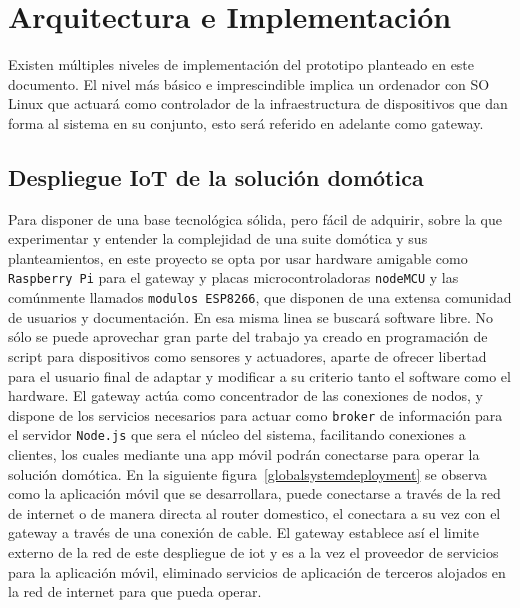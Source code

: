 \cleardoublepage

\chapter{Arquitectura e Implementación}
\label{ch:Capitulo4}

Existen múltiples niveles de implementación del prototipo planteado en este documento. El nivel más básico e imprescindible implica un ordenador con SO Linux que actuará como controlador de la infraestructura de dispositivos que dan forma al sistema en su conjunto, esto será referido en adelante como \gls{gateway}.


\section{Despliegue IoT de la solución domótica}
\label{ch:Capitulo4.1}
\vspace{1cm}

Para disponer de una base tecnológica sólida, pero fácil de adquirir, sobre la que experimentar y entender la complejidad de una suite domótica y sus planteamientos, en este proyecto se opta por usar hardware amigable como \verb|Raspberry Pi| para el \gls{gateway} y placas microcontroladoras \verb|nodeMCU| y las comúnmente llamados \verb|modulos ESP8266|, que disponen de una extensa comunidad de usuarios y documentación. En esa misma linea se buscará software libre. No sólo se puede aprovechar gran parte del trabajo ya creado en programación de \gls{script} para dispositivos como sensores y actuadores, aparte de ofrecer libertad para el usuario final de adaptar y modificar a su criterio tanto el software como el hardware. El \gls{gateway} actúa como concentrador de las conexiones de nodos, y dispone de los servicios necesarios para actuar como \verb|broker| de información para el servidor \verb|Node.js| que sera el núcleo del sistema, facilitando conexiones a clientes, los cuales mediante una \gls{app} móvil podrán conectarse para operar la solución domótica. En la siguiente figura~\ref{globalsystemdeployment} se observa como la aplicación móvil que se desarrollara, puede conectarse a través de la red de internet o de manera directa al router domestico, el conectara a su vez con el \gls{gateway} a través de una conexión de cable. El \gls{gateway} establece así el limite externo de la red de este despliegue de \gls{iot} y es a la vez el proveedor de servicios para la aplicación móvil, eliminado servicios de aplicación de terceros alojados en la red de internet para que pueda operar.

